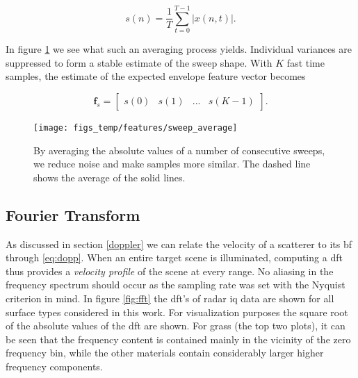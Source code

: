 \begin{equation}
	s(n) = \frac{1}{T}\sum_{t=0}^{T-1}|x(n, t)|.
\end{equation}

In figure \ref{fig:sweep_average} we see what such an averaging process yields. Individual variances are suppressed to form a stable estimate of the sweep shape. With $K$ fast time samples, the estimate of the expected envelope feature vector becomes 

\begin{equation}
	\mathbf{f}_{s} = 
	\begin{bmatrix}
		s(0) & s(1) & ... & s(K-1)
	\end{bmatrix}.
\end{equation}


\begin{figure}[h]
	\centering
	\texttt{[image: figs\_temp/features/sweep\_average]}
	\caption{By averaging the absolute values of a number of consecutive sweeps, we reduce noise and make samples more similar. The dashed line shows the average of the solid lines. }
	\label{fig:sweep_average}
\end{figure}


\subsection{Fourier Transform}

As discussed in section \ref{doppler} we can relate the velocity of a scatterer to its \gls{bf} through \ref{eq:dopp}. When an entire target scene is illuminated, computing a \gls{dft} thus provides a \emph{velocity profile} of the scene at every range. No aliasing in the frequency spectrum should occur as the sampling rate was set with the Nyquist criterion in mind. In figure \ref{fig:fft} the \gls{dft}'s of radar \gls{iq} data are shown for all surface types considered in this work. For visualization purposes the square root of the absolute values of the \gls{dft} are shown. For grass (the top two plots), it can be seen that the frequency content is contained mainly in the vicinity of the zero frequency bin, while the other materials contain considerably larger higher frequency components. %


